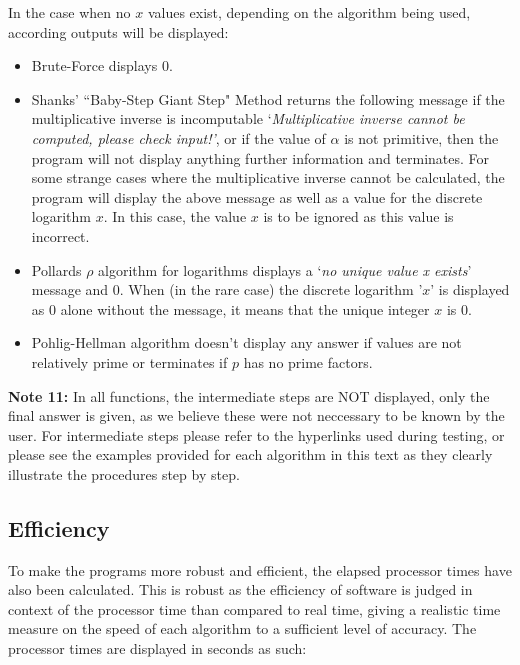 \documentclass[iwp,first]{luthesis}
\begin{document}
In the case when no $x$ values exist, depending on the algorithm being used, according outputs will be displayed:

\begin{itemize}

\item Brute-Force displays 0.

\item Shanks' ``Baby-Step Giant Step" Method returns the following message if the multiplicative inverse is incomputable `\textit{Multiplicative inverse cannot be computed, please check input!'}, or if the value of $\alpha$ is not primitive, then the program will not display anything further information and terminates. For some strange cases where the multiplicative inverse cannot be calculated, the program will display the above message as well as a value for the discrete logarithm $x$. In this case, the value $x$ is to be ignored as this value is incorrect.

\item Pollards $\rho$ algorithm for logarithms displays a `\textit{no unique value x exists}' message and 0. When (in the rare case) the discrete logarithm '$x$' is displayed as 0 alone without the message, it means that the unique integer $x$ is 0.

\item Pohlig-Hellman algorithm doesn't display any answer if values are not relatively prime or terminates if $p$ has no prime factors.

\end{itemize}

\textbf{Note 11:} In all functions, the intermediate steps are NOT displayed, only the final answer is given, as we believe these were not neccessary to be known by the user. For intermediate steps please refer to the hyperlinks used during testing, or please see the examples provided for each algorithm in this text as they clearly illustrate the procedures step by step.



\subsection{Efficiency}

To make the programs more robust and efficient, the elapsed processor times have also been calculated. This is robust as the efficiency of software is judged in context of the processor time than compared to real time, giving a realistic time measure on the speed of each algorithm to a sufficient level of accuracy. The processor times are displayed in seconds as such:
\end{document}
